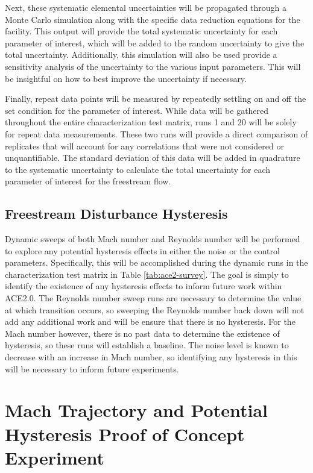 Next, these systematic elemental uncertainties will be propagated through a Monte Carlo simulation along with the specific data reduction equations for the facility. This output will provide the total systematic uncertainty for each parameter of interest, which will be added to the random uncertainty to give the total uncertainty. Additionally, this simulation will also be used provide a sensitivity analysis of the uncertainty to the various input parameters. This will be insightful on how to best improve the uncertainty if necessary.

Finally, repeat data points will be measured by repeatedly settling on and off the set condition for the parameter of interest. While data will be gathered throughout the entire characterization test matrix, runs 1 and 20 will be solely for repeat data measurements. These two runs will provide a direct comparison of replicates that will account for any correlations that were not considered or unquantifiable. The standard deviation of this data will be added in quadrature to the systematic uncertainty to calculate the total uncertainty for each parameter of interest for the freestream flow.

\subsection{Freestream Disturbance Hysteresis}

Dynamic sweeps of both Mach number and Reynolds number will be performed to explore any potential hysteresis effects in either the noise or the control parameters. Specifically, this will be accomplished during the dynamic runs in the characterization test matrix in Table \ref{tab:ace2-survey}. The goal is simply to identify the existence of any hysteresis effects to inform future work within ACE2.0. The Reynolds number sweep runs are necessary to determine the value at which transition occurs, so sweeping the Reynolds number back down will not add any additional work and will be ensure that there is no hysteresis. For the Mach number however, there is no past data to determine the existence of hysteresis, so these runs will establish a baseline. The noise level is known to decrease with an increase in Mach number, so identifying any hysteresis in this will be necessary to inform future experiments.

\section{Mach Trajectory and Potential Hysteresis Proof of Concept Experiment}

